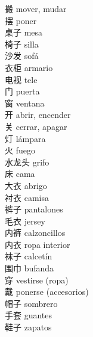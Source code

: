 搬 \quad mover, mudar\\
摆 \quad poner\\
桌子 \quad mesa\\
椅子 \quad silla\\
沙发 \quad sofá\\
衣柜 \quad armario\\
电视 \quad tele\\
门 \quad puerta\\
窗 \quad ventana\\
开 \quad abrir, encender\\
关 \quad cerrar, apagar\\
灯 \quad lámpara\\
火 \quad fuego\\
水龙头 \quad grifo\\
床 \quad cama\\
大衣 \quad abrigo\\
衬衣 \quad camisa\\
裤子 \quad pantalones\\
毛衣 \quad jersey\\
内裤 \quad calzoncillos\\
内衣 \quad ropa interior\\
袜子 \quad calcetín\\
围巾 \quad bufanda\\
穿 \quad vestirse (ropa)\\
戴 \quad ponerse (accesorios)\\
帽子 \quad sombrero\\
手套 \quad guantes\\
鞋子 \quad zapatos\\
